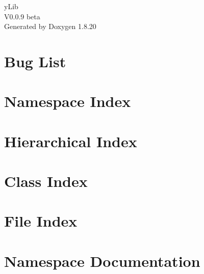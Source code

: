 \let\mypdfximage\pdfximage\def\pdfximage{\immediate\mypdfximage}\documentclass[twoside]{book}
\newcommand{\+}{\discretionary{\mbox{\scriptsize$\hookleftarrow$}}{}{}}
\newcommand{\clearemptydoublepage}{%
  \newpage{\pagestyle{empty}\cleardoublepage}%
}
\begin{document}
\hypersetup{pageanchor=false,
             bookmarksnumbered=true,
             pdfencoding=unicode
            }
\begin{titlepage}
\vspace*{7cm}
\begin{center}%
{\Large y\+Lib \\[1ex]\large V0.\+0.\+9 beta }\\
\vspace*{1cm}
{\large Generated by Doxygen 1.8.20}\\
\end{center}
\end{titlepage}
\clearemptydoublepage
{}
\tableofcontents
\clearemptydoublepage
{}
\hypersetup{pageanchor=true}

\chapter{Bug List}
\label{bug}

\chapter{Namespace Index}

\chapter{Hierarchical Index}

\chapter{Class Index}

\chapter{File Index}

\chapter{Namespace Documentation}

\end{document}
